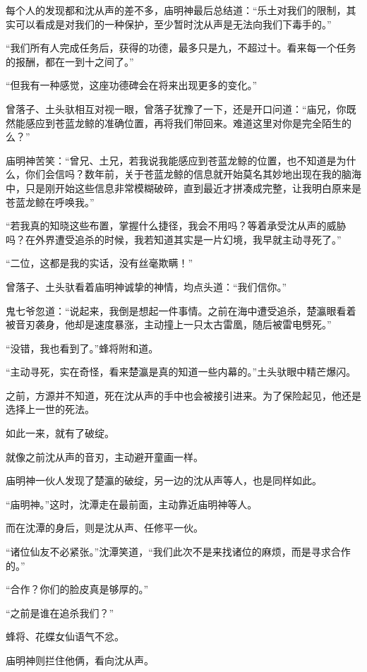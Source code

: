 \begin{this_body}
每个人的发现都和沈从声的差不多，庙明神最后总结道：“乐土对我们的限制，其实可以看成是对我们的一种保护，至少暂时沈从声是无法向我们下毒手的。”

“我们所有人完成任务后，获得的功德，最多只是九，不超过十。看来每一个任务的报酬，都在一到十之间了。”

“但我有一种感觉，这座功德碑会在将来出现更多的变化。”

曾落子、土头驮相互对视一眼，曾落子犹豫了一下，还是开口问道：“庙兄，你既然能感应到苍蓝龙鲸的准确位置，再将我们带回来。难道这里对你是完全陌生的么？”

庙明神苦笑：“曾兄、土兄，若我说我能感应到苍蓝龙鲸的位置，也不知道是为什么，你们会信吗？数年前，关于苍蓝龙鲸的信息就开始莫名其妙地出现在我的脑海中，只是刚开始这些信息非常模糊破碎，直到最近才拼凑成完整，让我明白原来是苍蓝龙鲸在呼唤我。”

“若我真的知晓这些布置，掌握什么捷径，我会不用吗？等着承受沈从声的威胁吗？在外界遭受追杀的时候，我若知道其实是一片幻境，我早就主动寻死了。”

“二位，这都是我的实话，没有丝毫欺瞒！”

曾落子、土头驮看着庙明神诚挚的神情，均点头道：“我们信你。”

鬼七爷忽道：“说起来，我倒是想起一件事情。之前在海中遭受追杀，楚瀛眼看着被音刃袭身，他却是速度暴涨，主动撞上一只太古雷凰，随后被雷电劈死。”

“没错，我也看到了。”蜂将附和道。

“主动寻死，实在奇怪，看来楚瀛是真的知道一些内幕的。”土头驮眼中精芒爆闪。

之前，方源并不知道，死在沈从声的手中也会被接引进来。为了保险起见，他还是选择上一世的死法。

如此一来，就有了破绽。

就像之前沈从声的音刃，主动避开童画一样。

庙明神一伙人发现了楚瀛的破绽，另一边的沈从声等人，也是同样如此。

“庙明神。”这时，沈潭走在最前面，主动靠近庙明神等人。

而在沈潭的身后，则是沈从声、任修平一伙。

“诸位仙友不必紧张。”沈潭笑道，“我们此次不是来找诸位的麻烦，而是寻求合作的。”

“合作？你们的脸皮真是够厚的。”

“之前是谁在追杀我们？”

蜂将、花蝶女仙语气不忿。

庙明神则拦住他俩，看向沈从声。


\end{this_body}
